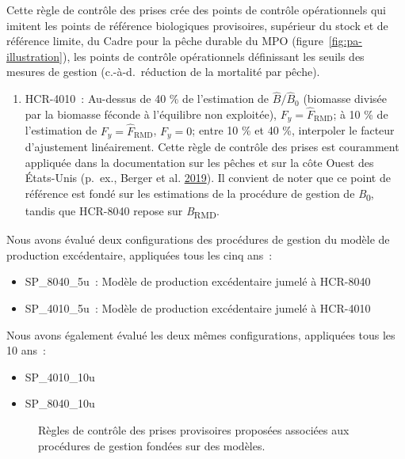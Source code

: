 \documentclass[french,11pt]{book}
\begin{document}
Cette règle de contrôle des prises crée des points de contrôle opérationnels qui imitent les points de référence biologiques provisoires, supérieur du stock et de référence limite, du Cadre pour la pêche durable du MPO (figure~\ref{fig:pa-illustration}), les points de contrôle opérationnels définissant les seuils des mesures de gestion (c.-à-d.~réduction de la mortalité par pêche).
\begin{enumerate}
\def\labelenumi{\arabic{enumi}.}
\setcounter{enumi}{1}

\item
  HCR-4010~: Au-dessus de 40 \% de l'estimation de \(\hat{B}/\hat{B}_0\) (biomasse divisée par la biomasse féconde à l'équilibre non exploitée), \(F_y = \hat{F}_\textrm{RMD}\); à 10 \% de l'estimation de \(F_y = \hat{F}_\textrm{RMD}\), \(F_y = 0\); entre 10 \% et 40 \%, interpoler le facteur d'ajustement linéairement. Cette règle de contrôle des prises est couramment appliquée dans la documentation sur les pêches et sur la côte Ouest des États-Unis (p.~ex., Berger et al. \protect\hyperlink{ref-berger_2019}{2019}). Il convient de noter que ce point de référence est fondé sur les estimations de la procédure de gestion de \emph{B}\textsubscript{0}, tandis que HCR-8040 repose sur \emph{B}\textsubscript{RMD}.
\end{enumerate}
Nous avons évalué deux configurations des procédures de gestion du modèle de production excédentaire, appliquées tous les cinq ans~:
\begin{itemize}
\item
  SP\_8040\_5u~: Modèle de production excédentaire jumelé à HCR-8040
\item
  SP\_4010\_5u~: Modèle de production excédentaire jumelé à HCR-4010
\end{itemize}
Nous avons également évalué les deux mêmes configurations, appliquées tous les 10 ans~:
\begin{itemize}
\item
  SP\_4010\_10u
\item
  SP\_8040\_10u
\end{itemize}
\begin{figure}[htb]

{\centering {} 

}

\caption{Règles de contrôle des prises provisoires proposées associées aux procédures de gestion fondées sur des modèles.}\label{fig:mp-hcrs}
\end{figure}
\clearpage
\end{document}
